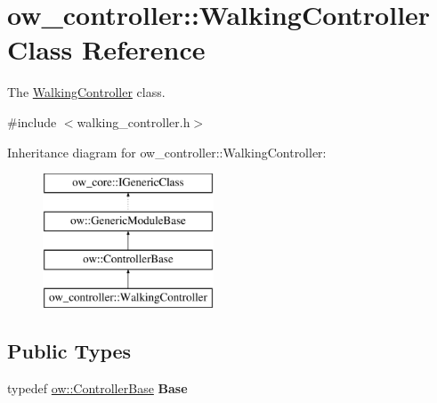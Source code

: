 \hypertarget{classow__controller_1_1WalkingController}{}\section{ow\+\_\+controller\+:\+:Walking\+Controller Class Reference}
\label{classow__controller_1_1WalkingController}


The \hyperlink{classow__controller_1_1WalkingController}{Walking\+Controller} class.  




{\ttfamily \#include $<$walking\+\_\+controller.\+h$>$}

Inheritance diagram for ow\+\_\+controller\+:\+:Walking\+Controller\+:\begin{figure}[H]
\begin{center}
\leavevmode
\includegraphics[height=4.000000cm]{d3/da7/classow__controller_1_1WalkingController}
\end{center}
\end{figure}
\subsection*{Public Types}
\begin{DoxyCompactItemize}
\item 
typedef \hyperlink{classow_1_1ControllerBase}{ow\+::\+Controller\+Base} {\bfseries Base}\hypertarget{classow__controller_1_1WalkingController_a09efb3f1caefb092f980f965b1147de6}{}\label{classow__controller_1_1WalkingController_a09efb3f1caefb092f980f965b1147de6}

\end{DoxyCompactItemize}
